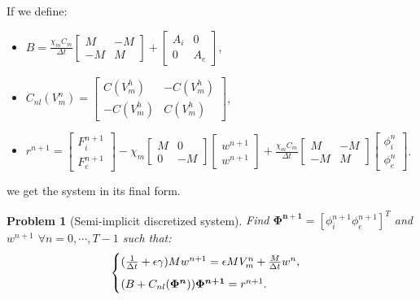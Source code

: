 \documentclass[a4paper,11pt]{article}
\newtheorem{problem}{Problem}
\begin{document}
\vspace{5mm}
\noindent If we define:
\begin{itemize}
\item $B=\frac{\chi_m C_m}{\Delta t} \begin{bmatrix} M &-M \\-M & M \end{bmatrix}+\begin{bmatrix} A_i & 0 \\ 0 & A_e \end{bmatrix}$,
\item $C_{nl}(V_m^n)=\begin{bmatrix}C(V_m^h) & -C(V_m^h) \\ -C(V_m^h) & C(V_m^h) \end{bmatrix}$,
\item $r^{n+1}=\begin{bmatrix} F_i^{n+1} \\ F_e^{n+1}\end{bmatrix}-\chi_m \begin{bmatrix}M & 0 \\ 0 & -M \end{bmatrix} \begin{bmatrix}w^{n+1} \\ w^{n+1} \end{bmatrix}+\frac{\chi_m C_m}{\Delta t} \begin{bmatrix} M &-M \\-M & M \end{bmatrix} \begin{bmatrix} \phi_i^n \\ \phi_e^n \end{bmatrix}$.
\end{itemize} \vspace{5mm}
we get the system in its final form.  \\
\begin{problem}[Semi-implicit discretized system]
Find $\bm{\Phi^{n+1}}=[\phi_i^{n+1} \phi_e^{n+1}]^T$ and $w^{n+1}$ $\forall n=0,\cdots,T-1$ such that:
\begin{equation*}
\begin{cases}
(\frac{1}{\Delta t}+\epsilon \gamma)M w^{n+1}=\epsilon M V_m^n+\frac{M}{\Delta t} w^n, \vspace{2mm} \\
(B+C_{nl}(\bm{\Phi^n})) \bm{\Phi^{n+1}}=r^{n+1}.
\end{cases}
\end{equation*} 
\end{problem}
\end{document}
